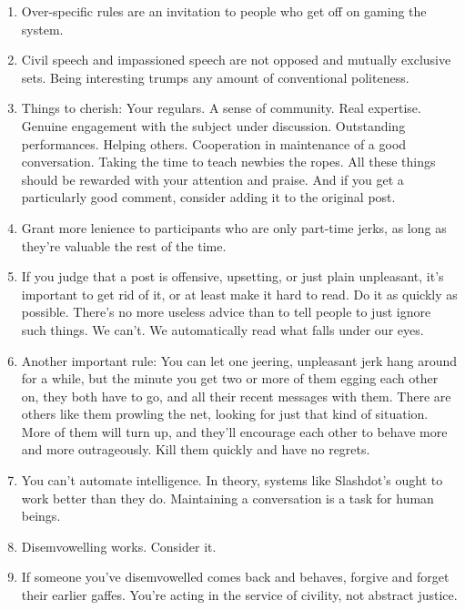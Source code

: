 \documentclass[a4paper,landscape,headrule,footrule,xetex]{foils}
\begin{document}
\begin{enumerate}
\item Over-specific rules are an invitation to people who get off on gaming the system.
\item  Civil speech and impassioned speech are not opposed and mutually exclusive sets. Being interesting trumps any amount of conventional politeness.
\item Things to cherish: Your regulars. A sense of community. Real expertise. Genuine engagement with the subject under discussion. Outstanding performances. Helping others. Cooperation in maintenance of a good conversation. Taking the time to teach newbies the ropes.
All these things should be rewarded with your attention and praise. And if you get a particularly good comment, consider adding it to the original post.
\item Grant more lenience to participants who are only part-time jerks, as long as they're valuable the rest of the time.
\item If you judge that a post is offensive, upsetting, or just plain unpleasant, it's important to get rid of it, or at least make it hard to read. Do it as quickly as possible. There's no more useless advice than to tell people to just ignore such things. We can't. We automatically read what falls under our eyes.
\item  Another important rule: You can let one jeering, unpleasant jerk hang around for a while, but the minute you get two or more of them egging each other on, they both have to go, and all their recent messages with them. There are others like them prowling the net, looking for just that kind of situation. More of them will turn up, and they'll encourage each other to behave more and more outrageously. Kill them quickly and have no regrets.
\item  You can't automate intelligence. In theory, systems like Slashdot's ought to work better than they do. Maintaining a conversation is a task for human beings.
\item Disemvowelling works. Consider it.
\item If someone you've disemvowelled comes back and behaves, forgive and forget their earlier gaffes. You're acting in the service of civility, not abstract justice.
\end{enumerate}
\end{document}
